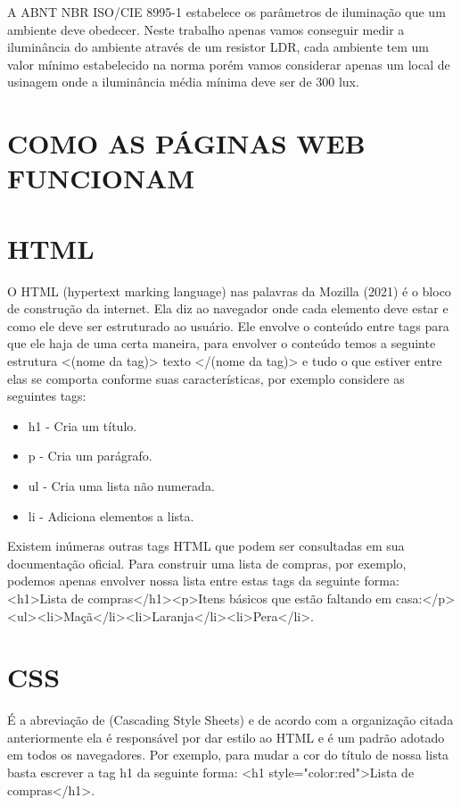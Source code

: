 A ABNT NBR ISO/CIE 8995-1 estabelece os parâmetros de iluminação que um ambiente deve obedecer. Neste trabalho apenas vamos conseguir medir a iluminância do ambiente através de um resistor LDR, cada ambiente tem um valor mínimo estabelecido na norma porém vamos considerar apenas um local de usinagem onde a iluminância média mínima deve ser de 300 lux.

\section{COMO AS PÁGINAS WEB FUNCIONAM}
\label{sec: como as paginas web funcionam}

\section{HTML}
\label{subsec: html}

O HTML (hypertext marking language) nas palavras da Mozilla (2021) é o bloco de construção da internet. Ela diz ao navegador onde cada elemento deve estar e como ele deve ser estruturado ao usuário. Ele envolve o conteúdo entre tags para que ele haja de uma certa maneira, para envolver o conteúdo temos a seguinte estrutura <(nome da tag)>  texto </(nome da tag)> e tudo o que estiver entre elas se comporta conforme suas características, por exemplo considere as seguintes tags:

\begin{itemize}
    \item h1 - Cria um título.
    \item p - Cria um parágrafo.
    \item ul - Cria uma lista não numerada.
    \item li - Adiciona elementos a lista.
\end{itemize}


Existem inúmeras outras tags HTML que podem ser consultadas em sua documentação oficial. Para construir uma lista de compras, por exemplo, podemos apenas envolver nossa lista entre estas tags da seguinte forma: <h1>Lista de compras</h1><p>Itens básicos que estão faltando em casa:</p><ul><li>Maçã</li><li>Laranja</li><li>Pera</li>.

\section{CSS}
\label{subsec: html}

É a abreviação de (Cascading Style Sheets) e de acordo com a organização citada anteriormente ela é responsável por dar estilo ao HTML e é um padrão adotado em todos os navegadores. Por exemplo, para mudar a cor do título de nossa lista basta escrever a tag h1 da seguinte forma: <h1 style="color:red">Lista de compras</h1>.

